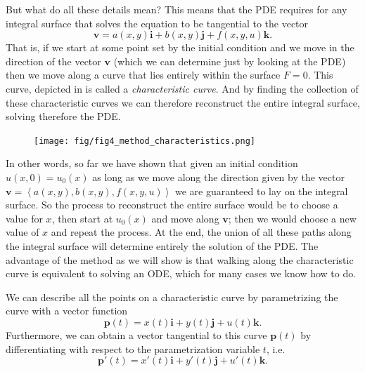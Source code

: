 But what do all these details mean? This means that the PDE requires for any
integral surface that solves the equation to be tangential to the vector
\begin{equation}
  \mathbf{v} = a(x,y) \mathbf{i} +
  b(x, y) \mathbf{j} +
  f(x, y, u) \mathbf{k}.
\end{equation}
That is, if we start at some point set by the initial condition and we move in
the direction of the vector $\mathbf{v}$ (which we can determine just by looking
at the PDE) then we move along a curve that lies entirely within the surface
$F = 0$. This curve, depicted in  is called a
\textit{characteristic curve}. And by finding the collection of these
characteristic curves we can therefore reconstruct the entire integral surface,
solving therefore the PDE.
\begin{figure}[h!]
	\centering \texttt{[image: fig/fig4\_method\_characteristics.png]}
	\caption{}
	\label{fig_characteristic_curve}
\end{figure}

In other words, so far we have shown that given an initial condition
$u(x, 0) = u_0(x)$ as long as we move along the direction given by the vector
$\mathbf{v} = \left\langle a(x,y), b(x,y), f(x,y,u) \right\rangle$ we are
guaranteed to lay on the integral surface. So the process to reconstruct the
entire surface would be to choose a value for $x$, then start at $u_0(x)$ and
move along $\mathbf{v}$; then we would choose a new value of $x$ and repeat the
process. At the end, the union of all these paths along the integral surface
will determine entirely the solution of the PDE. The advantage of the method as
we will show is that walking along the characteristic curve is equivalent to
solving an ODE, which for many cases we know how to do.

We can describe all the points on a characteristic curve by parametrizing
the curve with a vector function
\begin{equation}
  \mathbf{p}(t) = x(t) \mathbf{i} + y(t) \mathbf{j} + u(t) \mathbf{k}.
\end{equation}
Furthermore, we can obtain a vector tangential to this curve $\mathbf{p}(t)$ by
differentiating with respect to the parametrization variable $t$, i.e.
\begin{equation}
  \mathbf{p}'(t) = x'(t) \mathbf{i}+ y'(t) \mathbf{j} + u'(t) \mathbf{k}.
\end{equation}

